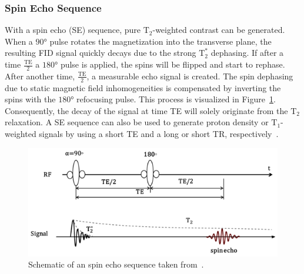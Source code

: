 \documentclass[english,version-2022-01]{uzl-thesis} %
\begin{document}
\subsubsection{Spin Echo Sequence}
With a spin echo (SE) sequence, pure $\text{T}_2$-weighted contrast can be generated. When a $90°$ pulse rotates the magnetization into the transverse plane, the resulting FID signal quickly decays due to the strong $\text{T}^*_2$ dephasing. If after a time $\frac{\text{TE}}{2}$ a $180°$ pulse is applied, the spins will be flipped and start to rephase. After another time, $\frac{\text{TE}}{2}$, a measurable echo signal is created. The spin dephasing due to static magnetic field inhomogeneities is compensated by inverting the spins with the $180°$ refocusing pulse. This process is visualized in Figure~\ref{fig:SpinEcho}.\\
Consequently, the decay of the signal at time TE will solely originate from the $\text{T}_2$ relaxation. A SE sequence can also be used to generate proton density or $\text{T}_1$-weighted signals by using a short TE and a long or short TR, respectively~\cite{PulseSequences}.

\begin{figure}[htpb]
	\centering
	\graphicspath{{images/}{\main/images/}}
	\includegraphics[width=\linewidth]{SpinEcho.png} 
	\caption{Schematic of an spin echo sequence taken from~\cite{PulseSequences}.}
	\label{fig:SpinEcho}
\end{figure}


\end{document}
